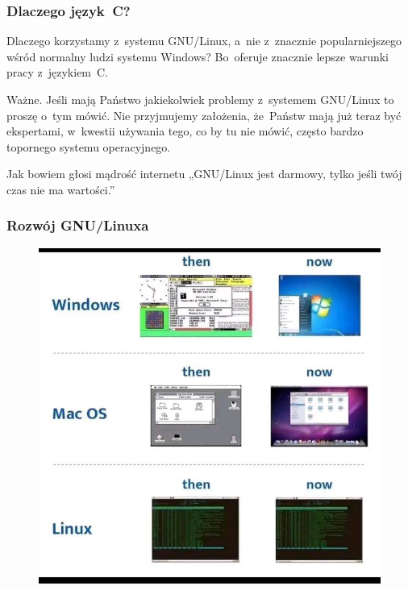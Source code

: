 \documentclass[10pt,t]{beamer}
\begin{document}
\begin{frame}
  \frametitle{Dlaczego język~C?}


  Dlaczego korzystamy z~systemu GNU/Linux, a~nie z~znacznie
  popularniejszego wśród normalny ludzi systemu Windows? Bo~oferuje
  znacznie lepsze warunki pracy z~językiem~C.

  \alert{Ważne.} Jeśli mają Państwo jakiekolwiek problemy z~systemem
  GNU/Linux to proszę o~tym \alert{mówić}. Nie przyjmujemy założenia,
  że~Państw mają już teraz być ekspertami, w~kwestii używania tego, co by
  tu nie mówić, często bardzo topornego systemu operacyjnego.

  Jak bowiem głosi mądrość internetu „GNU/Linux jest darmowy, tylko jeśli
  twój czas nie ma wartości.”

\end{frame}




\begin{frame}
  \frametitle{Rozwój GNU/Linuxa}

  \vspace{-0.5em}


  \begin{figure}

    \label{fig:Evolution-of-OS}

    \centering


    \includegraphics[scale=0.3]
    {./Presentations-pictures/Evolution-of-operating-systems.jpg}

  \end{figure}

\end{frame}
\end{document}
